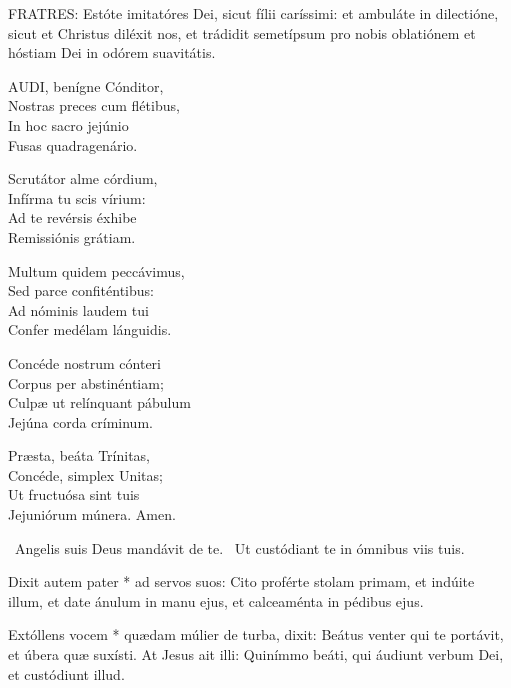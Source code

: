 

\lettrine[lines=2]{F}{RATRES}: Estóte imitatóres Dei, sicut fílii caríssimi: et ambuláte in dilectióne, sicut et Christus diléxit nos, et trádidit semetípsum pro nobis oblatiónem et hóstiam Dei in odórem suavitátis.


\lettrine[lines=2]{A}{UDI}, benígne Cónditor,\\
Nostras preces cum flétibus,\\
In hoc sacro jejúnio\\
Fusas quadragenário.

Scrutátor alme córdium,\\
Infírma tu scis vírium:\\
Ad te revérsis éxhibe\\
Remissiónis grátiam.

Multum quidem peccávimus,\\
Sed parce confiténtibus:\\
Ad nóminis laudem tui\\
Confer medélam lánguidis.

Concéde nostrum cónteri\\
Corpus per abstinéntiam;\\
Culpæ ut relínquant pábulum\\
Jejúna corda críminum.


Præsta, beáta Trínitas,\\
Concéde, simplex Unitas;\\
Ut fructuósa sint tuis\\
Jejuniórum múnera. Amen.

\V\ Angelis suis Deus mandávit de te. \R\ Ut custódiant te in ómnibus viis tuis.

 Dixit autem pater * ad servos suos: Cito proférte stolam primam, et indúite illum, et date ánulum in manu ejus, et calceaménta in pédibus ejus.


 Extóllens vocem * quædam múlier de turba, dixit: Beátus venter qui te portávit, et úbera quæ suxísti. At Jesus ait illi: Quinímmo beáti, qui áudiunt verbum Dei, et custódiunt illud.


